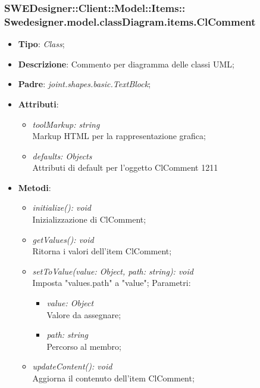 \documentclass[../DefinizioneDiProdotto.tex]{subfiles}
\begin{document}
			\subsubsection[Swedesigner.model.classDiagram.items.ClComment]{SWEDesigner::Client::Model::Items::\\Swedesigner.model.classDiagram.items.ClComment}
			\hypertarget{SWEDesigner::Client::Model::Items::Swedesigner.model.classDiagram.items.ClComment}{}
			\begin{itemize}
				\item \textbf{Tipo}: \emph{Class};
				\item \textbf{Descrizione}: Commento per diagramma delle classi UML;
				\item \textbf{Padre}: \emph{joint.shapes.basic.TextBlock};
				\item \textbf{Attributi}:
				\begin{itemize}
					\item \emph{toolMarkup: string}\\
					Markup HTML per la rappresentazione grafica;
					\item \emph{defaults: Objects}\\
					Attributi di default per l'oggetto ClComment 1211
				\end{itemize}
				\item \textbf{Metodi}:
				\begin{itemize}
					\item \emph{initialize(): void}\\
					Inizializzazione di ClComment;
					\item \emph{getValues(): void}\\
					Ritorna i valori dell'item ClComment;
					\item \emph{setToValue(value: Object, path: string): void}\\
					Imposta "values.path" a "value";
					Parametri:
					\begin{itemize}
						\item \emph{value: Object} \\
						Valore da assegnare;
						\item \emph{path: string} \\
						Percorso al membro;
					\end{itemize}
					\item \emph{updateContent(): void}\\
					Aggiorna il contenuto dell'item ClComment;	
				\end{itemize}
			\end{itemize}
			
\end{document}
